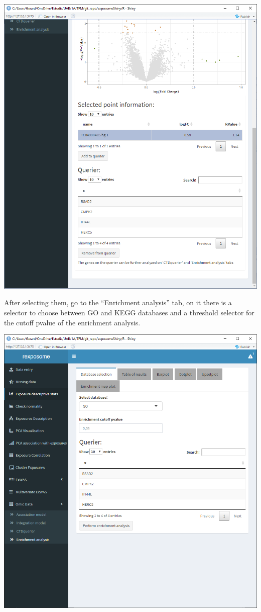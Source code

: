 \documentclass[
]{book}
\begin{document}
\includegraphics{images/analysis10_2.png}

After selecting them, go to the ``Enrichment analysis'' tab, on it there is a selector to choose between GO and KEGG databases and a threshold selector for the cutoff pvalue of the enrichment analysis.

\includegraphics{images/analysis11_1.png}
\end{document}
